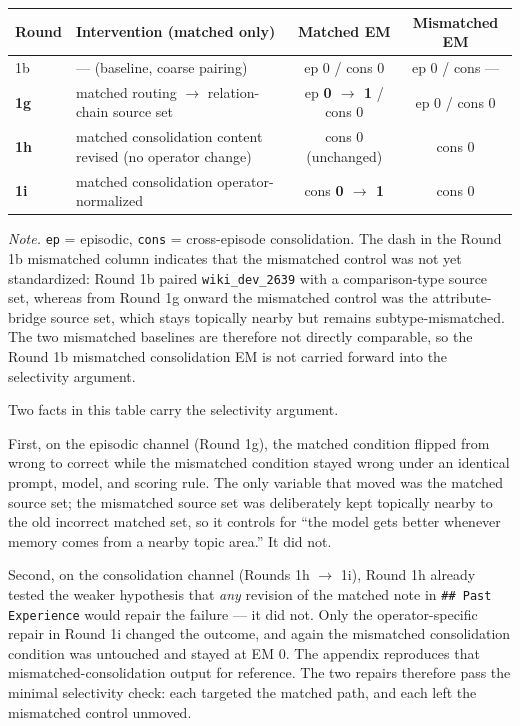 \documentclass[11pt]{article}
\begin{document}
\begin{center}
\begin{tabularx}{\textwidth}{>{\raggedright\arraybackslash}p{}Y c c}
\toprule
Round & Intervention (matched only) & Matched EM & Mismatched EM \\
\midrule
1b & --- (baseline, coarse pairing) & ep 0 / cons 0 & ep 0 / cons --- \\
\textbf{1g} & matched routing $\rightarrow$ relation-chain source set & ep \textbf{0 $\rightarrow$ 1} / cons 0 & ep 0 / cons 0 \\
\textbf{1h} & matched consolidation content revised (no operator change) & cons 0 (unchanged) & cons 0 \\
\textbf{1i} & matched consolidation operator-normalized & cons \textbf{0 $\rightarrow$ 1} & cons 0 \\
\bottomrule
\end{tabularx}
\end{center}

\textit{Note.} \texttt{ep} = episodic, \texttt{cons} = cross-episode consolidation. The dash in the Round 1b mismatched column indicates that the mismatched control was not yet standardized: Round 1b paired \texttt{wiki\_dev\_2639} with a comparison-type source set, whereas from Round 1g onward the mismatched control was the attribute-bridge source set, which stays topically nearby but remains subtype-mismatched. The two mismatched baselines are therefore not directly comparable, so the Round 1b mismatched consolidation EM is not carried forward into the selectivity argument.

Two facts in this table carry the selectivity argument.

First, on the episodic channel (Round 1g), the matched condition flipped from wrong to correct while the mismatched condition stayed wrong under an identical prompt, model, and scoring rule. The only variable that moved was the matched source set; the mismatched source set was deliberately kept topically nearby to the old incorrect matched set, so it controls for ``the model gets better whenever memory comes from a nearby topic area.'' It did not.

Second, on the consolidation channel (Rounds 1h $\rightarrow$ 1i), Round 1h already tested the weaker hypothesis that \emph{any} revision of the matched note in \texttt{\#\# Past Experience} would repair the failure --- it did not. Only the operator-specific repair in Round 1i changed the outcome, and again the mismatched consolidation condition was untouched and stayed at EM 0. The appendix reproduces that mismatched-consolidation output for reference. The two repairs therefore pass the minimal selectivity check: each targeted the matched path, and each left the mismatched control unmoved.
\end{document}
